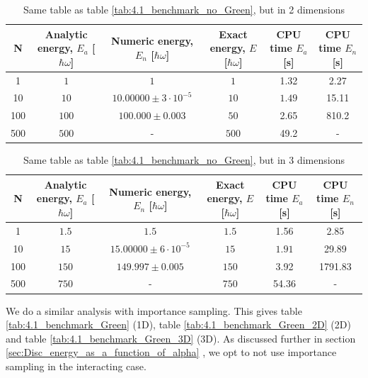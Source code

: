 \documentclass[a4paper, 10pt]{article}
\begin{document}
	\begin{table}[ht!]
		\caption{Same table as table \ref{tab:4.1_benchmark_no_Green}, but in 2 dimensions}\label{tab:4.1_benchmark_no_Green_2D}
		\begin{adjustwidth}{-2cm}{}
			\begin{tabular}{cccccc}
				N & Analytic energy, $E_a$ [$\hbar \omega$] & Numeric energy, $E_n$ [$\hbar \omega$] & Exact energy, $E$ [$\hbar \omega$]& CPU time $E_a$ [s] &CPU time $E_n$ [s]\\
				\hline
				1&$1$&$1$&$1$& 1.32&2.27\\
				10&$10$&$10.00000\pm 3\cdot 10^{-5}$&$10$& $1.49$&15.11\\
				100&$100$&$100.000\pm 0.003$&$50$&2.65&810.2\\
				500&$500$&- &$500$&49.2 &-
			\end{tabular}
		\end{adjustwidth}
	\end{table}
		\begin{table}[ht!]
			\caption{Same table as table \ref{tab:4.1_benchmark_no_Green}, but in 3 dimensions}\label{tab:4.1_benchmark_no_Green_3D}
			\begin{adjustwidth}{-2cm}{}
				\begin{tabular}{cccccc}
					N & Analytic energy, $E_a$ [$\hbar \omega$] & Numeric energy, $E_n$ [$\hbar \omega$] & Exact energy, $E$ [$\hbar \omega$]& CPU time $E_a$ [s] &CPU time $E_n$ [s]\\
					\hline
					1&$1.5$&$1.5$&$1.5$& 1.56&2.85\\
					10&$15$&$15.00000\pm 6\cdot 10^{-5}$&$15$& $1.91$&29.89\\
					100&$150$&$149.997\pm 0.005$&$150$&3.92&1791.83\\
					500&$750$&- &$750$&54.36 &-
				\end{tabular}
			\end{adjustwidth}
		\end{table}
		\linebreak
		We do a similar analysis with importance sampling. This gives table \ref{tab:4.1_benchmark_Green} (1D), table \ref{tab:4.1_benchmark_Green_2D} (2D) and table \ref{tab:4.1_benchmark_Green_3D} (3D). As discussed further in section \ref{sec:Disc_energy_as_a_function_of_alpha} , we opt to not use importance sampling in the interacting case.
\end{document}
